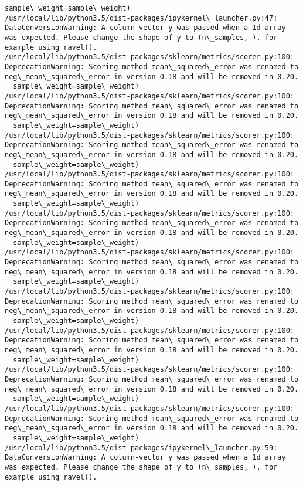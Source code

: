 \documentclass[11pt]{article}
\begin{document}
\begin{Verbatim}[commandchars=\\\{\}]
  sample\_weight=sample\_weight)
/usr/local/lib/python3.5/dist-packages/ipykernel\_launcher.py:47: DataConversionWarning: A column-vector y was passed when a 1d array was expected. Please change the shape of y to (n\_samples, ), for example using ravel().
/usr/local/lib/python3.5/dist-packages/sklearn/metrics/scorer.py:100: DeprecationWarning: Scoring method mean\_squared\_error was renamed to neg\_mean\_squared\_error in version 0.18 and will be removed in 0.20.
  sample\_weight=sample\_weight)
/usr/local/lib/python3.5/dist-packages/sklearn/metrics/scorer.py:100: DeprecationWarning: Scoring method mean\_squared\_error was renamed to neg\_mean\_squared\_error in version 0.18 and will be removed in 0.20.
  sample\_weight=sample\_weight)
/usr/local/lib/python3.5/dist-packages/sklearn/metrics/scorer.py:100: DeprecationWarning: Scoring method mean\_squared\_error was renamed to neg\_mean\_squared\_error in version 0.18 and will be removed in 0.20.
  sample\_weight=sample\_weight)
/usr/local/lib/python3.5/dist-packages/sklearn/metrics/scorer.py:100: DeprecationWarning: Scoring method mean\_squared\_error was renamed to neg\_mean\_squared\_error in version 0.18 and will be removed in 0.20.
  sample\_weight=sample\_weight)
/usr/local/lib/python3.5/dist-packages/sklearn/metrics/scorer.py:100: DeprecationWarning: Scoring method mean\_squared\_error was renamed to neg\_mean\_squared\_error in version 0.18 and will be removed in 0.20.
  sample\_weight=sample\_weight)
/usr/local/lib/python3.5/dist-packages/sklearn/metrics/scorer.py:100: DeprecationWarning: Scoring method mean\_squared\_error was renamed to neg\_mean\_squared\_error in version 0.18 and will be removed in 0.20.
  sample\_weight=sample\_weight)
/usr/local/lib/python3.5/dist-packages/sklearn/metrics/scorer.py:100: DeprecationWarning: Scoring method mean\_squared\_error was renamed to neg\_mean\_squared\_error in version 0.18 and will be removed in 0.20.
  sample\_weight=sample\_weight)
/usr/local/lib/python3.5/dist-packages/sklearn/metrics/scorer.py:100: DeprecationWarning: Scoring method mean\_squared\_error was renamed to neg\_mean\_squared\_error in version 0.18 and will be removed in 0.20.
  sample\_weight=sample\_weight)
/usr/local/lib/python3.5/dist-packages/sklearn/metrics/scorer.py:100: DeprecationWarning: Scoring method mean\_squared\_error was renamed to neg\_mean\_squared\_error in version 0.18 and will be removed in 0.20.
  sample\_weight=sample\_weight)
/usr/local/lib/python3.5/dist-packages/sklearn/metrics/scorer.py:100: DeprecationWarning: Scoring method mean\_squared\_error was renamed to neg\_mean\_squared\_error in version 0.18 and will be removed in 0.20.
  sample\_weight=sample\_weight)
/usr/local/lib/python3.5/dist-packages/ipykernel\_launcher.py:59: DataConversionWarning: A column-vector y was passed when a 1d array was expected. Please change the shape of y to (n\_samples, ), for example using ravel().

    \end{Verbatim}
\end{document}
